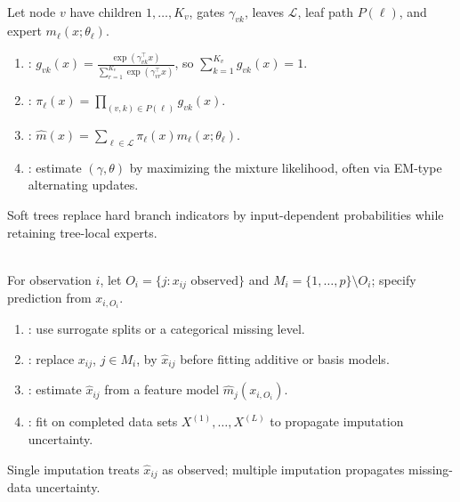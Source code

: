 \begin{remark} \label{rem:sl-soft-tree-mixtures-of-experts} \\
Let node $v$ have children $1,\ldots,K_v$, gates $\gamma_{vk}$, leaves $\mathcal L$, leaf path $P(\ell)$, and expert $m_\ell(x;\theta_\ell)$.
\begin{enumerate}[label=(\roman*)]
\setlength{\itemsep}{0pt}
\item {}: $g_{vk}(x)=\frac{\exp(\gamma_{vk}^\top x)}{\sum\limits_{r=1}^{K_v}\exp(\gamma_{vr}^\top x)}$, so $\sum\limits_{k=1}^{K_v}g_{vk}(x)=1$.
\item {}: $\pi_\ell(x)=\prod\limits_{(v,k)\in P(\ell)}g_{vk}(x)$.
\item {}: $\widehat m(x)=\sum\limits_{\ell\in\mathcal L}\pi_\ell(x)m_\ell(x;\theta_\ell)$.
\item {}: estimate $(\gamma,\theta)$ by maximizing the mixture likelihood, often via EM-type alternating updates.
\end{enumerate}
Soft trees replace hard branch indicators by input-dependent probabilities while retaining tree-local experts.
\end{remark}

\begin{remark} \label{rem:sl-missing-predictors-structured-learners} \\
For observation $i$, let $O_i=\{j:x_{ij}\text{ observed}\}$ and $M_i=\{1,\ldots,p\}\setminus O_i$; specify prediction from $x_{i,O_i}$.
\begin{enumerate}[label=(\roman*)]
\setlength{\itemsep}{0pt}
\item {}: use surrogate splits or a categorical missing level.
\item {}: replace $x_{ij}$, $j\in M_i$, by $\widehat x_{ij}$ before fitting additive or basis models.
\item {}: estimate $\widehat x_{ij}$ from a feature model $\widehat m_j(x_{i,O_i})$.
\item {}: fit on completed data sets $X^{(1)},\ldots,X^{(L)}$ to propagate imputation uncertainty.
\end{enumerate}
Single imputation treats $\widehat x_{ij}$ as observed; multiple imputation propagates missing-data uncertainty.
\end{remark}
